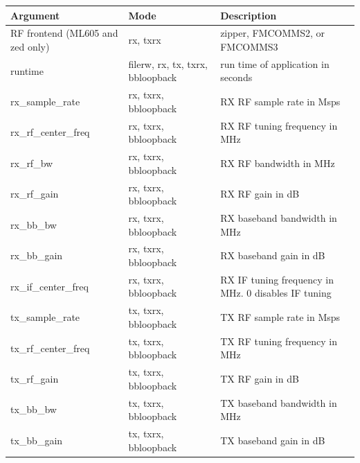 \begin{tabular}{|l|l|l|}
\hline
\rowcolor{blue}
Argument & Mode & Description \\
\hline
RF frontend (ML605 and zed only) & rx, txrx & zipper, FMCOMMS2, or FMCOMMS3\\
\hline
runtime & filerw, rx, tx, txrx, bbloopback & run time of application in seconds\\
\hline
rx\_sample\_rate & rx, txrx, bbloopback & RX RF sample rate in Msps\\
\hline
rx\_rf\_center\_freq & rx, txrx, bbloopback & RX RF tuning frequency in MHz\\
\hline
rx\_rf\_bw & rx, txrx, bbloopback & RX RF bandwidth in MHz\\
\hline
rx\_rf\_gain & rx, txrx, bbloopback & RX RF gain in dB\\
\hline
rx\_bb\_bw & rx, txrx, bbloopback & RX baseband bandwidth in MHz\\
\hline
rx\_bb\_gain & rx, txrx, bbloopback & RX baseband gain in dB\\
\hline
rx\_if\_center\_freq & rx, txrx, bbloopback & RX IF tuning frequency in MHz. 0 disables IF tuning\\
\hline
tx\_sample\_rate & tx, txrx, bbloopback & TX RF sample rate in Msps\\
\hline
tx\_rf\_center\_freq & tx, txrx, bbloopback & TX RF tuning frequency in MHz\\
\hline
tx\_rf\_gain & tx, txrx, bbloopback & TX RF gain in dB\\
\hline
tx\_bb\_bw & tx, txrx, bbloopback & TX baseband bandwidth in MHz\\
\hline
tx\_bb\_gain & tx, txrx, bbloopback & TX baseband gain in dB\\
\hline
\end{tabular}\par\medskip\medskip

